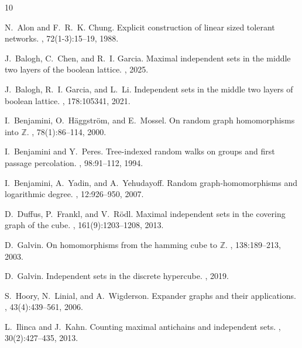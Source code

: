 \documentclass{amsart}
\theoremstyle{definition}
\newcommand{\0}[0]{\emptyset}
\begin{document}
\begin{thebibliography}{10}

N.~Alon and F.~R.~K. Chung.
\newblock Explicit construction of linear sized tolerant networks.
, 72(1-3):15--19, 1988.

J.~Balogh, C.~Chen, and R.~I. Garcia.
\newblock Maximal independent sets in the middle two layers of the boolean lattice.
, 2025.

J.~Balogh, R.~I. Garcia, and L.~Li.
\newblock Independent sets in the middle two layers of boolean lattice.
, 178:105341, 2021.

I.~Benjamini, O.~H{\"a}ggstr{\"o}m, and E.~Mossel.
\newblock On random graph homomorphisms into $\mathbb{Z}$.
, 78(1):86--114, 2000.

I.~Benjamini and Y.~Peres.
\newblock Tree-indexed random walks on groups and first passage percolation.
, 98:91--112, 1994.

I.~Benjamini, A.~Yadin, and A.~Yehudayoff.
\newblock Random graph-homomorphisms and logarithmic degree.
, 12:926--950, 2007.

D.~Duffus, P.~Frankl, and V.~R{\"o}dl.
\newblock Maximal independent sets in the covering graph of the cube.
, 161(9):1203--1208, 2013.

D.~Galvin.
\newblock On homomorphisms from the hamming cube to $\mathbb{Z}$.
, 138:189--213, 2003.

D.~Galvin.
\newblock Independent sets in the discrete hypercube.
, 2019.

S.~Hoory, N.~Linial, and A.~Wigderson.
\newblock Expander graphs and their applications.
, 43(4):439--561, 2006.

L.~Ilinca and J.~Kahn.
\newblock Counting maximal antichains and independent sets.
, 30(2):427--435, 2013.


\end{thebibliography}
\end{document}
